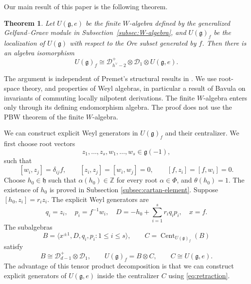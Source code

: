 \documentclass[12pt,a4paper]{amsart}
\numberwithin{equation}{section}
\newtheorem{theorem}{Theorem}[section]
\theoremstyle{definition}
\theoremstyle{remark}
\newcommand{\g}{\mathfrak g}
\newcommand{\h}{\mathfrak h}
\newcommand{\D}{\mathcal D}
\newcommand{\Z}{\mathbb Z}
\newcommand{\Cent}{\operatorname{Cent}}
\newcommand{\Uf}{U(\g)_f}
\begin{document}
Our main result of this paper is the following theorem.


\begin{theorem}\label{thm:main}
Let \(U(\g,e)\) be the finite $W$-algebra defined by the generalized Gelfand--Graev
module in Subsection~\ref{subsec:W-algebra}, and $\Uf$
be the localization of $U(\g)$ with respect to the Ore subset
generated by $f$.
Then there is an algebra isomorphism
\begin{equation}\label{eq:main}
 \Uf\cong \D^+_{h^\vee-2}\otimes \D_1\otimes U(\g,e).
\end{equation}
\end{theorem}

The argument is independent of Premet's structural results in \cite{Pr2}.
We use root-space theory, and properties of
Weyl algebras, in particular a result of Bavula \cite{Ba} on
invariants of commuting locally nilpotent derivations.
The finite \(W\)-algebra enters only through its defining
endomorphism algebra. The proof does not use the
PBW theorem of the finite \(W\)-algebra.



We can construct explicit Weyl generators in $\Uf$ and their centralizer.
We first choose root vectors
\[
 z_1,\dots,z_s,w_1,\dots,w_s\in\g(-1),
\]
such that
\begin{equation}\label{eq:Heisenberg}
 [w_i,z_j]=\delta_{ij}f,\qquad
 [z_i,z_j]=[w_i,w_j]=0,\qquad
 [f,z_i]=[f,w_i]=0.
\end{equation}
Choose \(h_0\in\h\) such that
 $\alpha(h_0)\in\Z$ for every root $\alpha\in\Phi$, and
 $\theta(h_0)=1$.
The existence of $h_0$ is proved in Subsection \ref{subsec:cartan-element}.
Suppose  \([h_0,z_i]=r_i z_i\). The explicit Weyl generators are
\begin{equation}\label{eq:explicit-generators}
 q_i=z_i,\quad p_i=f^{-1}w_i,\quad
 D=-h_0+\sum_{i=1}^s r_iq_ip_i,\quad x=f.
\end{equation}
The subalgebras
\begin{equation}\label{eq:B-and-C-intro}
 B=\langle x^{\pm1},D,q_i,p_i:1\leq i\leq s\rangle,
 \qquad C=\Cent_{\Uf}(B)
\end{equation}
satisfy
\[
 B\cong\D^+_{d-1}\otimes \D_1,\qquad \Uf=B\otimes C,\qquad C\cong U(\g,e).
\]
The advantage of this tensor product decomposition is that we can construct explicit generators of $U(\g,e)$ inside the centralizer $C$ using \eqref{eq:retraction}.
\end{document}
